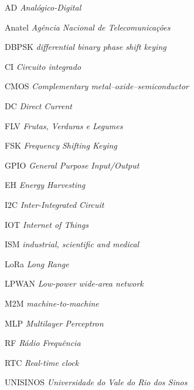 \listoffigures*
\cleardoublepage

\listofquadros*
\cleardoublepage

\listoftables*
\cleardoublepage

\begin{siglas}
    \item[AD] \textit{Analógico-Digital}
    \item[Anatel]   \textit{Agência Nacional de Telecomunicações}
    \item[DBPSK]    \textit{differential binary phase shift keying} %
    \item[CI]   \textit{Circuito integrado}
    \item[CMOS] \textit{Complementary metal–oxide–semiconductor} %
    \item[DC]  \textit{Direct Current}%
    \item[FLV] \textit{Frutas, Verduras e Legumes}
    \item[FSK] \textit{Frequency Shifting Keying} %
    \item[GPIO]     \textit{General Purpose Input/Output} %
    \item[EH]   \textit{Energy Harvesting}%
    \item[I2C]  \textit{Inter-Integrated Circuit} %
    \item[IOT]  \textit{Internet of Things} %
    \item[ISM]  \textit{industrial, scientific and medical}%
    \item[LoRa] \textit{Long Range} %
    \item[LPWAN] \textit{Low-power wide-area network}%
    \item[M2M] \textit{machine-to-machine}%
    \item [MLP] \textit{Multilayer Perceptron} %
    \item[RF]  \textit{Rádio Frequência}
    \item[RTC]  \textit{Real-time clock}%
    \item[UNISINOS]  \textit{Universidade do Vale do Rio dos Sinos}

\end{siglas}

